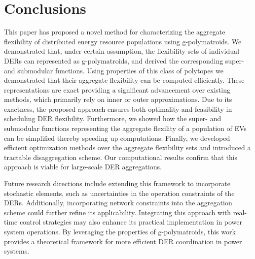 \section{Conclusions}\label{sec:conc}
This paper has proposed a novel method for characterizing the aggregate flexibility of distributed energy resource populations using g-polymatroids. 
We demonstrated that, under certain assumption, the flexibility sets of individual DERs can represented as g-polymatroids, and derived the corresponding super- and submodular functions. 
Using properties of this class of polytopes we demonstrated that their aggregate flexibility can be computed efficiently.
These representations are exact providing a significant advancement over existing methods, which primarily rely on inner or outer approximations.
Due to its exactness, the proposed approach ensures both optimality and feasibility in scheduling DER flexibility.
Furthermore, we showed how the super- and submodular functions representing the aggregate flexility of a population of EVs can be simplified thereby speeding up computations.
Finally, we developed efficient optimization methods over the aggregate flexibility sets and introduced a tractable disaggregation scheme.
Our computational results confirm that this approach is viable for large-scale DER aggregations.

Future research directions include extending this framework to incorporate stochastic elements, such as uncertainties in the operation constraints of the DERs.
Additionally, incorporating network constraints into the aggregation scheme could further refine its applicability. Integrating this approach with real-time control strategies may also enhance its practical implementation in power system operations. By leveraging the properties of g-polymatroids, this work provides a theoretical framework for more efficient DER coordination in power systems.